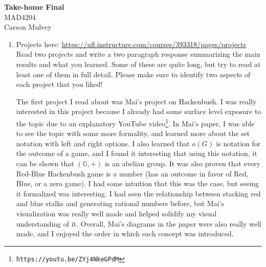 \documentclass[11pt,letterpaper,dvipsnames]{article}
\begin{document}

\flushleft

\begin{center}
    \begin{large}
        \textbf{Take-home Final} \\
        MAD4204 \\ 
        Carson Mulvey
    \end{large}
\end{center}

\pagestyle{empty}


\flushleft

\begin{enumerate}

	\item Projects here: \url{https://ufl.instructure.com/courses/393318/pages/projects}\newline
	Read two projects and write a two paragraph response summarizing the main results and what you learned.
	Some of these are quite long, but try to read at least one of them in full detail.
	Please make sure to identify two aspects of each project that you liked!
	
	\color{BlueViolet}
	
	\hspace{1cm}
	The first project I read about was Mai's project on Hackenbush. I was really interested in this project because I already had some surface level exposure to the topic due to an explanatory YouTube video\footnote{\texttt{https://youtu.be/ZYj4NkeGPdM}}. In Mai's paper, I was able to see the topic with some more formality, and learned more about the set notation with left and right options. I also learned that $o(G)$ is notation for the outcome of a game, and I found it interesting that using this notation, it can be shown that $(\mathbb{G},+)$ is an abelian group. It was also proven that every Red-Blue Hackenbush game is a number (has an outcome in favor of Red, Blue, or a zero game). I had some intuition that this was the case, but seeing it formalized was interesting. I had seen the relationship between stacking red and blue stalks and generating rational numbers before, but Mai's visualization was really well made and helped solidify my visual understanding of it. Overall, Mai's diagrams in the paper were also really well made, and I enjoyed the order in which each concept was introduced.
	

\end{enumerate}
\end{document}
